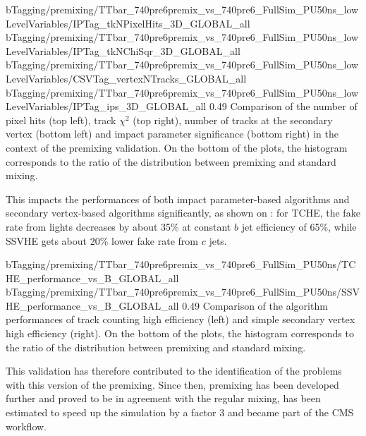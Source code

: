                       {bTagging/premixing/TTbar_740pre6premix_vs_740pre6_FullSim_PU50ns_lowLevelVariables/IPTag_tkNPixelHits_3D_GLOBAL_all}
                      {bTagging/premixing/TTbar_740pre6premix_vs_740pre6_FullSim_PU50ns_lowLevelVariables/IPTag_tkNChiSqr_3D_GLOBAL_all}
                      {bTagging/premixing/TTbar_740pre6premix_vs_740pre6_FullSim_PU50ns_lowLevelVariables/CSVTag_vertexNTracks_GLOBAL_all}
                      {bTagging/premixing/TTbar_740pre6premix_vs_740pre6_FullSim_PU50ns_lowLevelVariables/IPTag_ips_3D_GLOBAL_all}
                      {0.49}
                      {Comparison of the number of pixel hits (top left), track $\chi^2$
                      (top right), number of tracks at the secondary vertex (bottom left) and
                      impact parameter significance (bottom right) in the context
                      of the premixing validation. On the bottom of the plots, the histogram corresponds
                      to the ratio of the distribution between premixing and standard mixing. }

    This impacts the performances of both impact parameter-based algorithms and
     secondary vertex-based algorithms significantly, as shown on
    : for TCHE, the fake rate from lights
    decreases by about 35\% at constant $b$ jet efficiency of 65\%, while SSVHE gets about 20\%
    lower fake rate from $c$ jets.

                     {bTagging/premixing/TTbar_740pre6premix_vs_740pre6_FullSim_PU50ns/TCHE_performance_vs_B_GLOBAL_all}
                     {bTagging/premixing/TTbar_740pre6premix_vs_740pre6_FullSim_PU50ns/SSVHE_performance_vs_B_GLOBAL_all}
                     {0.49}
                     {Comparison of the algorithm performances of track counting high
                      efficiency (left) and simple secondary vertex high efficiency (right).
                      On the bottom of the plots, the histogram corresponds
                      to the ratio of the distribution between premixing and standard mixing. }

    This validation has therefore contributed to the identification of the problems with
    this version of the premixing. Since then, premixing has been developed further and
    proved to be in agreement with the regular mixing, has been estimated to speed up the
    simulation by a factor 3 \cite{Premixing} and became part of the CMS workflow.

